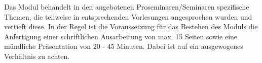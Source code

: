 \begin{module}
\begin{content}
Das Modul behandelt in den angebotenen Proseminaren/Seminaren spezifische Themen, die teilweise in entsprechenden Vorlesungen angesprochen wurden und vertieft diese. In der Regel ist die Voraussetzung für das Bestehen des Moduls die Anfertigung einer schriftlichen Ausarbeitung von max. 15 Seiten sowie eine mündliche Präsentation von 20 - 45 Minuten. Dabei ist auf ein ausgewogenes Verhältnis zu achten.


\end{content}



\end{module}

